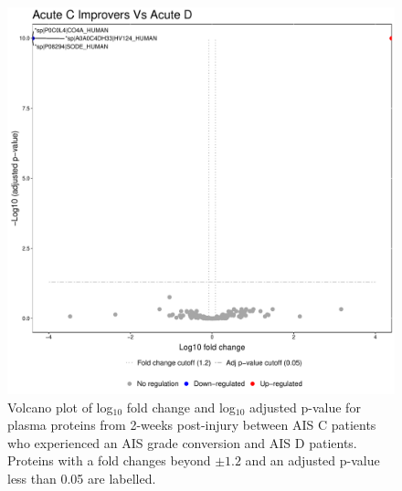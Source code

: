 \documentclass[9pt,lineno]{elife}
\begin{document}
\begin{landscape}
\begin{landscape}
\begin{landscape}
\begin{landscape}
\begin{figure}
\includegraphics[width=1\linewidth]{figures/openms_protein_quantification/label_free/volcano_plots/openms_volcano_plot_2021-08-10_0009} \caption{Volcano plot of log\(_10\) fold change and log\(_10\) adjusted p-value for plasma proteins from 2-weeks post-injury between AIS C patients who experienced an AIS grade conversion and AIS D patients. Proteins with a fold changes beyond \(\pm 1.2\) and an adjusted p-value less than 0.05 are labelled.}\label{fig:volc-plot-acute-c-imp-vs-acute-d}
\end{figure}




\end{landscape}
\end{landscape}
\end{landscape}
\end{landscape}
\end{document}
